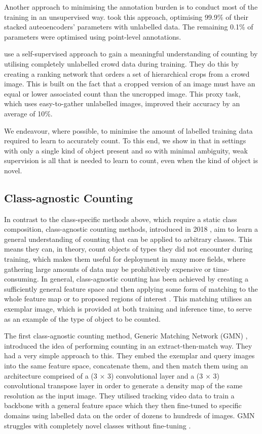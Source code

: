 \documentclass[../thesis.tex]{subfiles}
\begin{document}
Another approach to minimising the annotation burden is to conduct most of the training in an unsupervised way.
\citet{sam2019almost} took this approach, optimising 99.9\% of their stacked auteoencoders' parameters with unlabelled data. The remaining 0.1\% of parameters were optimised using point-level annotations. 

\citet{liu2018leveraging} use a self-supervised approach to gain a meaningful understanding of counting by utilising completely unlabelled crowd data during training. They do this by creating a ranking network that orders a set of hierarchical crops from a crowd image. This is built on the fact that a cropped version of an image must have an equal or lower associated count than the uncropped image. 
This proxy task, which uses easy-to-gather unlabelled images, improved their accuracy by an average of 10\%.

We endeavour, where possible, to minimise the amount of labelled training data required to learn to accurately count.
To this end, we show in  that in settings with only a single kind of object present and so with minimal ambiguity, weak supervision is all that is needed to learn to count, even when the kind of object is novel.


\subsection{Class-agnostic Counting}
In contrast to the class-specific methods above, which require a static class composition, class-agnostic counting methods, introduced in 2018 \cite{Lu18}, aim to learn a general understanding of counting that can be applied to arbitrary classes. 
This means they can, in theory, count objects of types they did not encounter during training, which makes them useful for deployment in many more fields, where gathering large amounts of data may be prohibitively expensive or time-consuming.
In general, class-agnostic counting has been achieved by creating a sufficiently general feature space and then applying some form of matching to the whole feature map \cite{yang2021cfoc, shi2022represent} or to proposed regions of interest \cite{ranjan2021Famnet, sokhandan2020few}.
This matching utilises an exemplar image, which is provided at both training and inference time, to serve as an example of the type of object to be counted.

The first class-agnostic counting method, Generic Matching Network (GMN) \cite{Lu2018}, introduced the idea of performing counting in an extract-then-match way.
They had a very simple approach to this.
They embed the exemplar and query images into the same feature space, concatenate them, and then match them using an architecture comprised of a (3 $\times$ 3) convolutional layer and a (3 $\times$ 3) convolutional transpose layer in order to generate a density map of the same resolution as the input image.
They utilised tracking video data to train a backbone with a general feature space which they then fine-tuned to specific domains using labelled data on the order of dozens to hundreds of images.
GMN struggles with completely novel classes without fine-tuning \cite{ranjan2021Famnet}.
\end{document}
